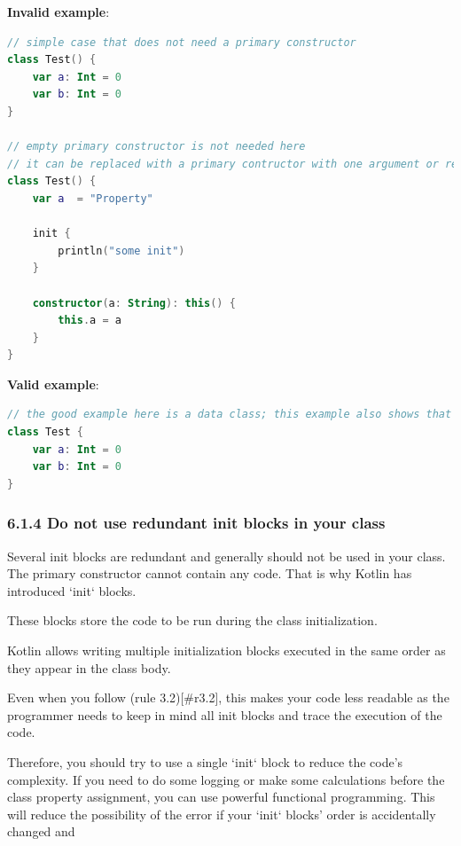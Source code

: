 {{{{\textbf{Invalid example}:

\begin{lstlisting}[language=Kotlin]
// simple case that does not need a primary constructor
class Test() {
    var a: Int = 0
    var b: Int = 0
}

// empty primary constructor is not needed here
// it can be replaced with a primary contructor with one argument or removed
class Test() {
    var a  = "Property"

    init {
        println("some init")
    }

    constructor(a: String): this() {
        this.a = a
    }
}
\end{lstlisting}


\textbf{Valid example}:

\begin{lstlisting}[language=Kotlin]
// the good example here is a data class; this example also shows that you should get rid of braces for the primary constructor
class Test {
    var a: Int = 0
    var b: Int = 0
}
\end{lstlisting}


\subsubsection*{\textbf{6.1.4 Do not use redundant init blocks in your class}}
\leavevmode\newline

\label{sec:6.1.4}

Several init blocks are redundant and generally should not be used in your class. The primary constructor cannot contain any code. That is why Kotlin has introduced `init` blocks.

These blocks store the code to be run during the class initialization.

Kotlin allows writing multiple initialization blocks executed in the same order as they appear in the class body.

Even when you follow (rule 3.2)[\#r3.2], this makes your code less readable as the programmer needs to keep in mind all init blocks and trace the execution of the code.

Therefore, you should try to use a single `init` block to reduce the code's complexity. If you need to do some logging or make some calculations before the class property assignment, you can use powerful functional programming. This will reduce the possibility of the error if your `init` blocks' order is accidentally changed and

}}}}

